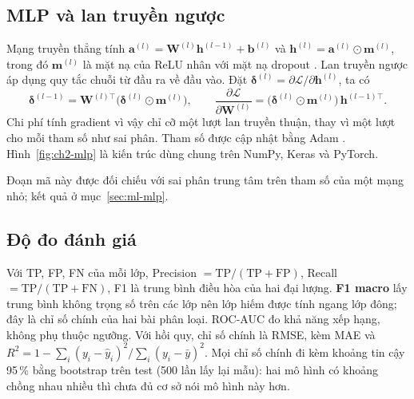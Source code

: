 \subsection{MLP và lan truyền ngược}
Mạng truyền thẳng tính $\mathbf{a}^{(l)}=\mathbf{W}^{(l)}\mathbf{h}^{(l-1)}+\mathbf{b}^{(l)}$ và $\mathbf{h}^{(l)}=\mathbf{a}^{(l)}\odot\mathbf{m}^{(l)}$, trong đó $\mathbf{m}^{(l)}$ là mặt nạ của ReLU nhân với mặt nạ dropout \cite{ch2:srivastava2014}. Lan truyền ngược \cite{ch2:rumelhart1986} áp dụng quy tắc chuỗi từ đầu ra về đầu vào. Đặt $\boldsymbol\delta^{(l)}=\partial\mathcal{L}/\partial\mathbf{h}^{(l)}$, ta có
\begin{equation}
  \boldsymbol\delta^{(l-1)}=\mathbf{W}^{(l)\top}\big(\boldsymbol\delta^{(l)}\odot\mathbf{m}^{(l)}\big),\qquad
  \frac{\partial\mathcal{L}}{\partial\mathbf{W}^{(l)}}=\big(\boldsymbol\delta^{(l)}\odot\mathbf{m}^{(l)}\big)\,\mathbf{h}^{(l-1)\top}.
\end{equation}
Chi phí tính gradient vì vậy chỉ cỡ một lượt lan truyền thuận, thay vì một lượt cho mỗi tham số như sai phân. Tham số được cập nhật bằng Adam \cite{ch2:kingma2015}. Hình~\ref{fig:ch2-mlp} là kiến trúc dùng chung trên NumPy, Keras và PyTorch.



Đoạn mã này được đối chiếu với sai phân trung tâm trên  tham số của một mạng nhỏ; kết quả ở mục~\ref{sec:ml-mlp}.

\subsection{Độ đo đánh giá}
Với TP, FP, FN của mỗi lớp, Precision $=\mathrm{TP}/(\mathrm{TP}+\mathrm{FP})$, Recall $=\mathrm{TP}/(\mathrm{TP}+\mathrm{FN})$, F1 là trung bình điều hòa của hai đại lượng. \textbf{F1 macro} lấy trung bình không trọng số trên các lớp nên lớp hiếm được tính ngang lớp đông; đây là chỉ số chính của hai bài phân loại. ROC-AUC \cite{ch2:fawcett2006} đo khả năng xếp hạng, không phụ thuộc ngưỡng. Với hồi quy, chỉ số chính là RMSE, kèm MAE và $R^2=1-\sum_i(y_i-\hat y_i)^2/\sum_i(y_i-\bar y)^2$. Mọi chỉ số chính đi kèm khoảng tin cậy 95\,\% bằng bootstrap trên test (500 lần lấy lại mẫu): hai mô hình có khoảng chồng nhau nhiều thì chưa đủ cơ sở nói mô hình này hơn.

